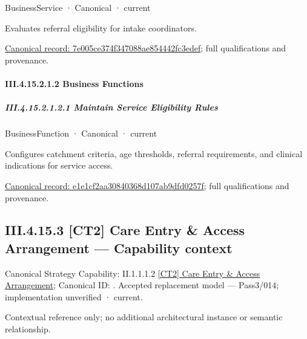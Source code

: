 \label{element:7e005ce374f347088ae854442fc3edef}
{\small BusinessService · Canonical · current}\par

Evaluates referral eligibility for intake coordinators.


{\footnotesize \href{../../../../continuum/business/business-service/7e005ce374f347088ae854442fc3edef.md}{Canonical record: 7e005ce374f347088ae854442fc3edef}; full qualifications and provenance.}\par
\paragraph*{III.4.15.2.1.2 Business Functions}
\label{navigation:III.4.15.2.1.2}

\subparagraph*{III.4.15.2.1.2.1 Maintain Service Eligibility Rules}
\label{navigation:III.4.15.2.1.2.1}

\label{element:e1e1cf2aa30840368d107ab9dfd0257f}
{\small BusinessFunction · Canonical · current}\par

Configures catchment criteria, age thresholds, referral requirements, and clinical indications for service access.


{\footnotesize \href{../../../../continuum/business/business-function/e1e1cf2aa30840368d107ab9dfd0257f.md}{Canonical record: e1e1cf2aa30840368d107ab9dfd0257f}; full qualifications and provenance.}\par
\subsection*{III.4.15.3 [CT2] Care Entry \& Access Arrangement — Capability context}
\label{navigation:III.4.15.3}

{\small Canonical Strategy Capability: II.1.1.1.2 \hyperref[element:199f8d09f6304730a17cfe6ce79a9282]{[CT2] Care Entry \& Access Arrangement}; Canonical ID: \texttt{}. Accepted replacement model — Pass3/014; implementation unverified · current.}\par
Contextual reference only; no additional architectural instance or semantic relationship.\par
